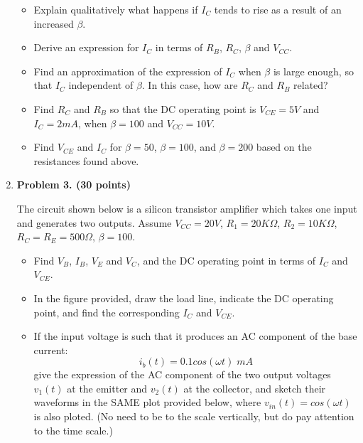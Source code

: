 \begin{enumerate}

\begin{itemize}
\item Explain qualitatively what happens if $I_C$ tends to rise as a
  result of an increased $\beta$.
\item Derive an expression for $I_C$ in terms of $R_B$, $R_C$, $\beta$
  and $V_{CC}$.
\item Find an approximation of the expression of $I_C$ when $\beta$ is 
  large enough, so that $I_C$ independent of $\beta$. In this case, how 
  are $R_C$ and $R_B$ related?
\item Find $R_C$ and $R_B$ so that the DC operating point is $V_{CE}=5V$ 
and $I_C=2mA$, when $\beta=100$ and $V_{CC}=10V$. 
\item Find $V_{CE}$ and $I_C$ for $\beta=50$, $\beta=100$, and $\beta=200$
	based on the resistances found above.
\end{itemize}

\item {\bf Problem 3. (30 points)} 


The circuit shown below is a silicon transistor amplifier which takes one
input and generates two outputs. Assume $V_{CC}=20V$, $R_1=20K\Omega$,
$R_2=10K\Omega$, $R_C=R_E=500\Omega$, $\beta=100$. 

\begin{itemize}
\item Find $V_B$, $I_B$, $V_E$ and $V_C$, and the DC operating point in 
terms of $I_C$ and $V_{CE}$. 
\item In the figure provided, draw the load line, indicate the DC operating 
point, and find the corresponding $I_C$ and $V_{CE}$.
\item If the input voltage is such that it produces an AC component of the 
base current:
\[	i_b(t)=0.1 cos(\omega t) \; mA	\]
give the expression of the AC component of the two output voltages $v_1(t)$ 
at the emitter and $v_2(t)$ at the collector, and sketch their waveforms in 
the SAME plot provided below, where $v_{in}(t)=cos(\omega t)$ is also ploted.
(No need to be to the scale vertically, but do pay attention to the time
scale.)
\end{itemize}





\end{enumerate}
